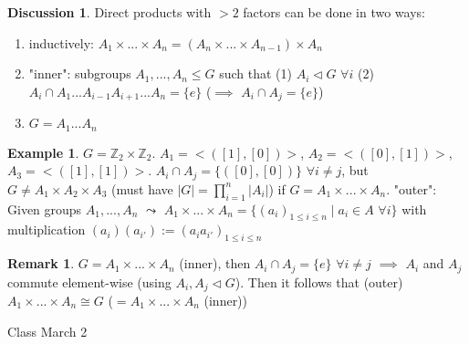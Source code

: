 \documentclass[11pt]{article}
\theoremstyle{definition}
\newtheorem{example}[thm]{Example}
\newtheorem{dis}[thm]{Discussion}
\newtheorem{rem}[thm]{Remark}
\numberwithin{equation}{section}
\newcommand{\Z}{\mathbb{Z}}
\begin{document}
\begin{dis}
Direct products with $> 2$ factors can be done in two ways:
\begin{enumerate}
    \item inductively: $A_1 \times ... \times A_n = (A_n \times ... \times A_{n-1}) \times A_n$
    \item "inner": subgroups $A_1, ..., A_n \leq G$ such that (1) $A_i \vartriangleleft G$ $\forall i$ (2) $A_i \cap A_1 ... A_{i-1}A_{i+1}...A_n = \{e\}$ ($\implies$ $A_i \cap A_j = \{e\}$)
    \item $G = A_{1}...A_{n}$
\end{enumerate}
\end{dis}
\begin{example}
$G = \Z_2 \times \Z_2$. $A_1 = <([1], [0])>$, $A_2 = <([0], [1])>$, $A_3 = <([1], [1])>$. $A_{i} \cap A_{j} = \{([0],[0])\}$ $\forall i \neq j$, but $G \neq A_1 \times A_2 \times A_3$ (must have $|G| = \prod\limits_{i=1}^n |A_i|$) if $G = A_1 \times...\times A_n$. "outer": Given groups $A_1,...,A_n$ $\leadsto$ $A_1 \times...\times A_n = \{(a_i)_{1 \leq i \leq n} \mid a_i \in A$ $\forall i \}$ with multiplication $(a_{i})(a_{i'}) := (a_{i}a_{i'})_{1 \leq i \leq n}$
\end{example}
\begin{rem}
$G = A_1 \times...\times A_n$ (inner), then $A_{i} \cap A_{j} = \{e\}$ $\forall i \neq j$ $\implies$ $A_i$ and $A_j$ commute element-wise (using $A_{i}, A_{j} \vartriangleleft G$). Then it follows that (outer) $A_1 \times...\times A_n \cong G$ ($= A_{1} \times ... \times A_{n}$ (inner))
\end{rem}

\begin{center}
{\sf\LARGE Class March 2}
\end{center}
\end{document}
